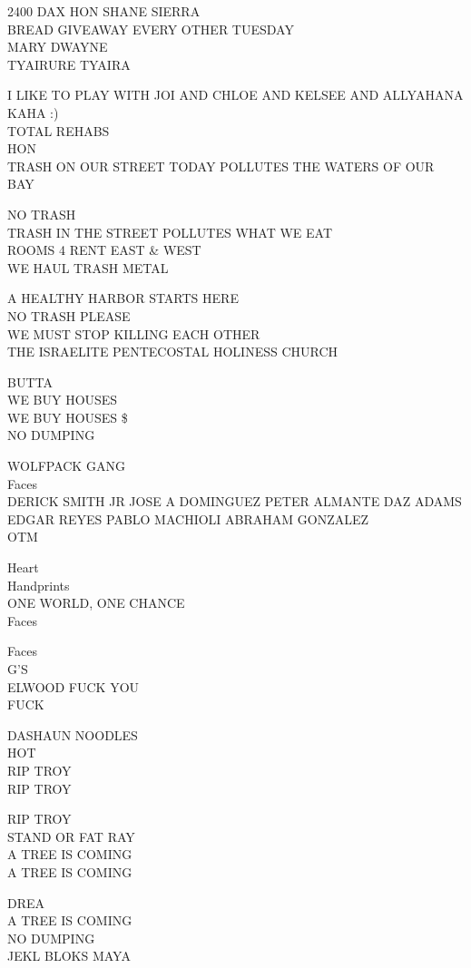 \documentclass[10pt,letterpaper]{article}
\begin{document}
2400 DAX HON SHANE SIERRA\\
BREAD GIVEAWAY EVERY OTHER TUESDAY\\
MARY DWAYNE\\
TYAIRURE TYAIRA

I LIKE TO PLAY WITH JOI AND CHLOE AND KELSEE AND ALLYAHANA KAHA :)\\
TOTAL REHABS\\
HON\\
TRASH ON OUR STREET TODAY POLLUTES THE WATERS OF OUR BAY

NO TRASH\\
TRASH IN THE STREET POLLUTES WHAT WE EAT\\
ROOMS 4 RENT EAST \& WEST\\
WE HAUL TRASH METAL

A HEALTHY HARBOR STARTS HERE\\
NO TRASH PLEASE\\
WE MUST STOP KILLING EACH OTHER\\
THE ISRAELITE PENTECOSTAL HOLINESS CHURCH

BUTTA\\
WE BUY HOUSES\\
WE BUY HOUSES \$\\
NO DUMPING

WOLFPACK GANG\\
Faces\\
DERICK SMITH JR JOSE A DOMINGUEZ PETER ALMANTE DAZ ADAMS EDGAR REYES PABLO MACHIOLI ABRAHAM GONZALEZ\\
OTM

Heart\\
Handprints\\
ONE WORLD, ONE CHANCE\\
Faces

Faces\\
G'S\\
ELWOOD FUCK YOU\\
FUCK

DASHAUN NOODLES\\
HOT\\
RIP TROY\\
RIP TROY

RIP TROY\\
STAND OR FAT RAY\\
A TREE IS COMING\\
A TREE IS COMING

DREA\\
A TREE IS COMING\\
NO DUMPING\\
JEKL BLOKS MAYA
\end{document}
